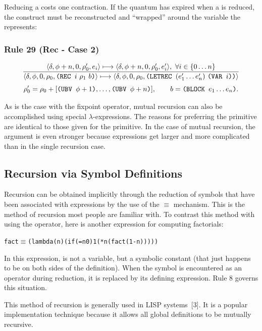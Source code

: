 Reducing a  costs one contraction. If the quantum has expired when a
 is reduced, the  construct must be reconstructed and
``wrapped'' around the variable the  represents:

\subsubsection*{Rule 29 (Rec - Case 2)}
\[
\frac{
\cfg{\delta}{\phi+n}{0}{\rho'_0}{e_i}\redsto
\cfg{\delta}{\phi+n}{0}{\rho'_0}{e'_i},\ \forall i\in\{0\ldots n\}
}{
\cfg{\delta}{\phi}{0}{\rho_0}{\THOR{(REC }i\ \rho_1\ b\THOR{)}}\redsto
\cfg{\delta}{\phi}{0}{\rho_0}{\THOR{(LETREC }(e'_1\ldots e'_n)\ \THOR{(VAR }i\THOR{))}}
}
\]
\[
\rho'_0=\rho_0+[\texttt{(UBV }\phi+1\texttt{)},\ldots,\texttt{(UBV }\phi+n\texttt{)}],
\qquad b=\texttt{(BLOCK }e_1\ldots e_n\texttt{)}.
\]

As is the case with the fixpoint operator, mutual recursion can also be
accomplished using special \(\lambda\)-expressions. The reasons for preferring
the  primitive are identical to those given for the 
primitive. In the case of mutual recursion, the argument is even stronger
because expressions get larger and more complicated than in the single recursion
case.

\subsection{Recursion via Symbol Definitions}

Recursion can be obtained implicitly through the reduction of symbols that have
been associated with expressions by the use of the \(\equiv\) mechanism. This is the
method of recursion most people are familiar with. To contrast this method with
using the  operator, here is another expression for computing
factorials:
\begin{alltt}
fact \(\equiv\) (lambda (n) (if (= n 0) 1 (* n (fact (1- n)))))
\end{alltt}
In this expression,  is not a variable, but a symbolic constant (that
just happens to be on both sides of the definition). When the symbol
 is encountered as an operator during reduction, it is replaced by
its defining expression. Rule 8 governs this situation.

This method of recursion is generally used in LISP systems~[3]. It is a popular
implementation technique because it allows all global definitions to be mutually
recursive.

